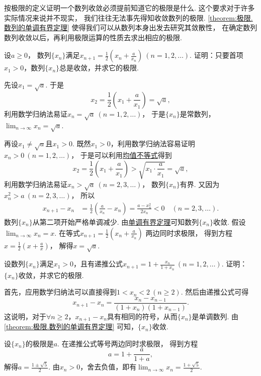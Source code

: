 按极限的定义证明一个数列收敛必须提前知道它的极限是什么.
这个要求对于许多实际情况来说并不现实，
我们往往无法事先得知收敛数列的极限.
\cref{theorem:极限.数列的单调有界定理} 使得我们可以从数列本身出发去研究其敛散性，
在确定数列数列收敛以后，再利用极限运算的性质去求出相应的极限.

\begin{example}
设\(a\geq0\)，
数列\(\{x_n\}\)满足\(x_{n+1} = \frac12\left(x_n+\frac{a}{x_n}\right)\ (n=1,2,\dotsc)\).
证明：只要首项\(x_1>0\)，数列\(\{x_n\}\)总是收敛，并求它的极限.
\begin{solution}
先设\(x_1=\sqrt{a}\).
于是\[
	x_2 = \frac12 \left(x_1+\frac{a}{x_1}\right)
	= \sqrt{a},
\]
利用数学归纳法易证\(x_n = \sqrt{a}\ (n=1,2,\dotsc)\)，
于是\(\{x_n\}\)是常数列，
\(\lim_{n\to\infty} x_n = \sqrt{a}\).

再设\(x_1\neq\sqrt{a}\)且\(x_1>0\).
既然\(x_1>0\)，利用数学归纳法容易证明\(x_n>0\ (n=1,2,\dotsc)\)，
于是可以利用\hyperref[theorem:不等式.基本不等式2推论1]{均值不等式}得到\[
	x_2
	= \frac12\left(x_1+\frac{a}{x_1}\right)
	> \sqrt{x_1 \cdot \frac{a}{x_1}}
	= \sqrt{a},
\]
利用数学归纳法易证\(x_n > \sqrt{a}\ (n=2,3,\dotsc)\)，
数列\(\{x_n\}\)有界.
又因为\(x_n^2 > a\ (n=2,3,\dotsc)\)，
所以\begin{align*}
	x_{n+1}-x_n
	&= \frac12 \left(\frac{a}{x_n}-x_n\right)
	= \frac{a-x_n^2}{2x_n}
	< 0
	\quad(n=2,3,\dotsc).
\end{align*}
数列\(\{x_n\}\)从第二项开始严格单调减少.
由\hyperref[theorem:极限.数列的单调有界定理]{单调有界定理}可知数列\(\{x_n\}\)收敛.
假设\(\lim_{n\to\infty} x_n = x\).
在等式\(x_{n+1} = \frac12\left(x_n+\frac{a}{x_n}\right)\)
两边同时求极限，
得到方程\(x = \frac12\left(x+\frac{a}{x}\right)\)，
解得\(x = \sqrt{a}\).
\end{solution}
\end{example}

\begin{example}
设数列\(\{x_n\}\)满足\(x_1>0\)，且有递推公式\(x_{n+1}=1+\frac{x_n}{1+x_n}\ (n=1,2,\dotsc)\).
证明：\(\{x_n\}\)收敛，并求它的极限.
\begin{solution}
首先，应用数学归纳法可以直接得到\(1<x_n<2\ (n\geq2)\).
然后由递推公式可得\[
	x_{n+1}-x_n = \frac{x_n-x_{n-1}}{(1+x_n)(1+x_{n-1})}.
\]
这说明，对于\(\forall n\geq2\)，\(x_{n+1}-x_n\)具有相同的符号，从而\(\{x_n\}\)是单调数列.
由\cref{theorem:极限.数列的单调有界定理} 可知，\(\{x_n\}\)收敛.

设\(\{x_n\}\)的极限是\(a\).
在递推公式等号两边同时求极限，
得到方程\[
	a = 1 + \frac{a}{1+a},
\]
解得\(a = \frac{1\pm\sqrt5}2\).
由\(x_n>0\)，舍去负值，即有\(\lim_{n\to\infty} x_n = \frac{1+\sqrt5}2\).
\end{solution}
\end{example}

